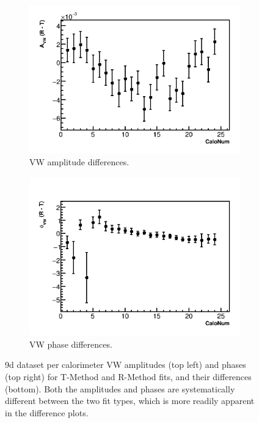 \documentclass[12pt,letterpaper]{article}
\begin{document}
\begin{figure}[]
    \begin{subfigure}[t]{0.45\textwidth}
        \centering
        \includegraphics[width=\textwidth]{9d_noTimeRand_Avw_Diff}
        \caption{VW amplitude differences.}
    \end{subfigure}%
    \hspace{5mm}
    \begin{subfigure}[t]{0.45\textwidth}
        \centering
        \includegraphics[width=\textwidth]{9d_noTimeRand_Phivw_Diff}
        \caption{VW phase differences.}
    \end{subfigure}
\caption[]{9d dataset per calorimeter VW amplitudes (top left) and phases (top right) for T-Method and R-Method fits, and their differences (bottom). Both the amplitudes and phases are systematically different between the two fit types, which is more readily apparent in the difference plots.}
\label{fig:9d_VW_calo_noRand}
\end{figure}
\end{document}
